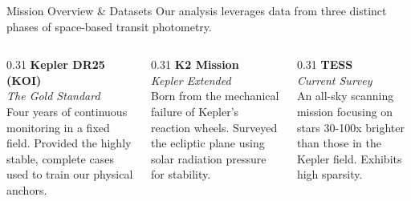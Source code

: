 \documentclass[9pt, aspectratio=169]{beamer}
\begin{document}
\begin{frame}{Mission Overview \& Datasets}
    Our analysis leverages data from three distinct phases of space-based transit photometry.\footnotemark
    
    \vspace{1em}
    \begin{columns}[T]
        \begin{column}{0.31\textwidth}
            \textbf{\textcolor{DeepPurple}{Kepler DR25 (KOI)}}\\
            \textit{The Gold Standard}\\
            Four years of continuous monitoring in a fixed field. Provided the highly stable, complete cases used to train our physical anchors.
        \end{column}
        
        \begin{column}{0.31\textwidth}
            \textbf{\textcolor{DeepPurple}{K2 Mission}}\\
            \textit{Kepler Extended}\\
            Born from the mechanical failure of Kepler’s reaction wheels. Surveyed the ecliptic plane using solar radiation pressure for stability.
        \end{column}
        
        \begin{column}{0.31\textwidth}
            \textbf{\textcolor{DeepPurple}{TESS}}\\
            \textit{Current Survey}\\
            An all-sky scanning mission focusing on stars 30-100x brighter than those in the Kepler field. Exhibits high sparsity.
        \end{column}
    \end{columns}
\end{frame}
\end{document}
